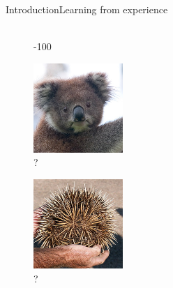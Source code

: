 \begin{frame}{Introduction}{Learning from experience}
\begin{figure}[ht]
\begin{minipage}[b]{0.2\linewidth}
\\{\color{red}-100}
\end{minipage}
\hfill
\begin{minipage}[b]{0.2\linewidth}
\centering
\includegraphics[width=\textwidth]{img/introduction/koala.png}
\\?
\end{minipage}
\hfill
\begin{minipage}[b]{0.2\linewidth}
\centering
\includegraphics[width=\textwidth]{img/introduction/echidna.png}
\\?
\end{minipage}

\end{figure}
\end{frame}

